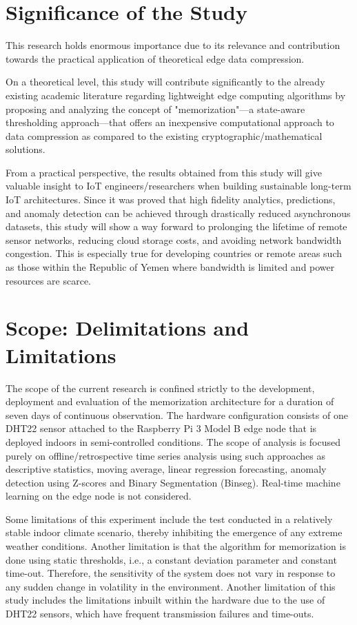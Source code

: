 \section{Significance of the Study}
This research holds enormous importance due to its relevance and contribution towards the practical application of theoretical edge data compression.

On a theoretical level, this study will contribute significantly to the already existing academic literature regarding lightweight edge computing algorithms by proposing and analyzing the concept of "memorization"—a state-aware thresholding approach—that offers an inexpensive computational approach to data compression as compared to the existing cryptographic/mathematical solutions. 

From a practical perspective, the results obtained from this study will give valuable insight to IoT engineers/researchers when building sustainable long-term IoT architectures. Since it was proved that high fidelity analytics, predictions, and anomaly detection can be achieved through drastically reduced asynchronous datasets, this study will show a way forward to prolonging the lifetime of remote sensor networks, reducing cloud storage costs, and avoiding network bandwidth congestion. This is especially true for developing countries or remote areas such as those within the Republic of Yemen where bandwidth is limited and power resources are scarce.

\section{Scope: Delimitations and Limitations}
The scope of the current research is confined strictly to the development, deployment and evaluation of the memorization architecture for a duration of seven days of continuous observation. The hardware configuration consists of one DHT22 sensor attached to the Raspberry Pi 3 Model B edge node that is deployed indoors in semi-controlled conditions. The scope of analysis is focused purely on offline/retrospective time series analysis using such approaches as descriptive statistics, moving average, linear regression forecasting, anomaly detection using Z-scores and Binary Segmentation (Binseg). Real-time machine learning on the edge node is not considered.

Some limitations of this experiment include the test conducted in a relatively stable indoor climate scenario, thereby inhibiting the emergence of any extreme weather conditions. Another limitation is that the algorithm for memorization is done using static thresholds, i.e., a constant deviation parameter and constant time-out. Therefore, the sensitivity of the system does not vary in response to any sudden change in volatility in the environment. Another limitation of this study includes the limitations inbuilt within the hardware due to the use of DHT22 sensors, which have frequent transmission failures and time-outs.

